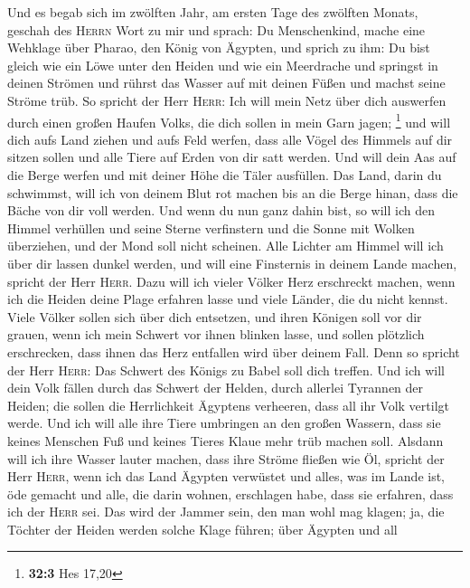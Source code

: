  Und es begab sich im zwölften Jahr, am ersten Tage des
zwölften Monats, geschah des \textsc{Herrn} Wort zu mir und sprach:
 Du Menschenkind, mache eine Wehklage über Pharao, den
König von Ägypten, und sprich zu ihm: Du bist gleich wie ein Löwe unter
den Heiden und wie ein Meerdrache und springst in deinen Strömen und
rührst das Wasser auf mit deinen Füßen und machst seine Ströme trüb.
 So spricht der Herr \textsc{Herr}: Ich will mein Netz
über dich auswerfen durch einen großen Haufen Volks, die dich sollen in
mein Garn jagen; \footnote{\textbf{32:3} Hes 17,20}  und
will dich aufs Land ziehen und aufs Feld werfen, dass alle Vögel des
Himmels auf dir sitzen sollen und alle Tiere auf Erden von dir satt
werden.  Und will dein Aas auf die Berge werfen und mit
deiner Höhe die Täler ausfüllen.  Das Land, darin du
schwimmst, will ich von deinem Blut rot machen bis an die Berge hinan,
dass die Bäche von dir voll werden.  Und wenn du nun ganz
dahin bist, so will ich den Himmel verhüllen und seine Sterne
verfinstern und die Sonne mit Wolken überziehen, und der Mond soll nicht
scheinen.  Alle Lichter am Himmel will ich über dir lassen
dunkel werden, und will eine Finsternis in deinem Lande machen, spricht
der Herr \textsc{Herr}.  Dazu will ich vieler Völker Herz
erschreckt machen, wenn ich die Heiden deine Plage erfahren lasse und
viele Länder, die du nicht kennst.  Viele Völker sollen
sich über dich entsetzen, und ihren Königen soll vor dir grauen, wenn
ich mein Schwert vor ihnen blinken lasse, und sollen plötzlich
erschrecken, dass ihnen das Herz entfallen wird über deinem Fall.
 Denn so spricht der Herr \textsc{Herr}: Das Schwert des
Königs zu Babel soll dich treffen.  Und ich will dein
Volk fällen durch das Schwert der Helden, durch allerlei Tyrannen der
Heiden; die sollen die Herrlichkeit Ägyptens verheeren, dass all ihr
Volk vertilgt werde.  Und ich will alle ihre Tiere
umbringen an den großen Wassern, dass sie keines Menschen Fuß und keines
Tieres Klaue mehr trüb machen soll.  Alsdann will ich
ihre Wasser lauter machen, dass ihre Ströme fließen wie Öl, spricht der
Herr \textsc{Herr},  wenn ich das Land Ägypten verwüstet
und alles, was im Lande ist, öde gemacht und alle, die darin wohnen,
erschlagen habe, dass sie erfahren, dass ich der \textsc{Herr} sei.
 Das wird der Jammer sein, den man wohl mag klagen; ja,
die Töchter der Heiden werden solche Klage führen; über Ägypten und all
